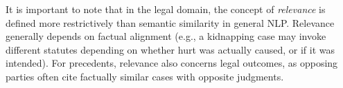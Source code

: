 It is important to note that in the legal domain,  the concept of \textit{relevance} is defined more restrictively than semantic similarity in general NLP. Relevance generally depends on factual alignment (e.g., a kidnapping case may invoke different statutes depending on whether hurt was actually caused, or if it was intended). For precedents, relevance also concerns legal outcomes, as opposing parties often cite factually similar cases with opposite judgments.

 

